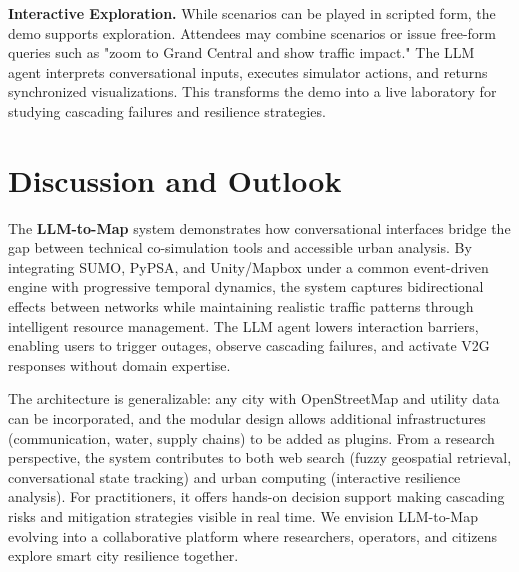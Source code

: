 \documentclass[sigconf,review,nonacm]{acmart}
\begin{document}
\noindent\textbf{Interactive Exploration.}
While scenarios can be played in scripted form, the demo supports exploration. Attendees may combine scenarios or issue free-form queries such as "zoom to Grand Central and show traffic impact." The LLM agent interprets conversational inputs, executes simulator actions, and returns synchronized visualizations. This transforms the demo into a live laboratory for studying cascading failures and resilience strategies.

\section{Discussion and Outlook}
The \textbf{LLM-to-Map} system demonstrates how conversational interfaces bridge the gap between technical co-simulation tools and accessible urban analysis. By integrating SUMO, PyPSA, and Unity/Mapbox under a common event-driven engine with progressive temporal dynamics, the system captures bidirectional effects between networks while maintaining realistic traffic patterns through intelligent resource management. The LLM agent lowers interaction barriers, enabling users to trigger outages, observe cascading failures, and activate V2G responses without domain expertise.

The architecture is generalizable: any city with OpenStreetMap and utility data can be incorporated, and the modular design allows additional infrastructures (communication, water, supply chains) to be added as plugins. From a research perspective, the system contributes to both web search (fuzzy geospatial retrieval, conversational state tracking) and urban computing (interactive resilience analysis). For practitioners, it offers hands-on decision support making cascading risks and mitigation strategies visible in real time. We envision LLM-to-Map evolving into a collaborative platform where researchers, operators, and citizens explore smart city resilience together.



\end{document}
